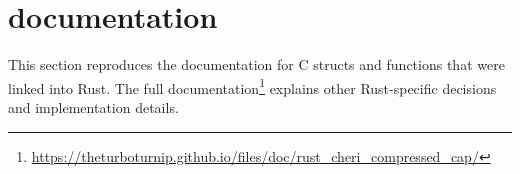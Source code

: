 \chapter{ documentation}\label{appx:docs:rustcherilib}
This section reproduces the documentation for  C structs and functions that were linked into Rust.
The full documentation\footnote{\url{https://theturboturnip.github.io/files/doc/rust_cheri_compressed_cap/}} explains other Rust-specific decisions and implementation details.



